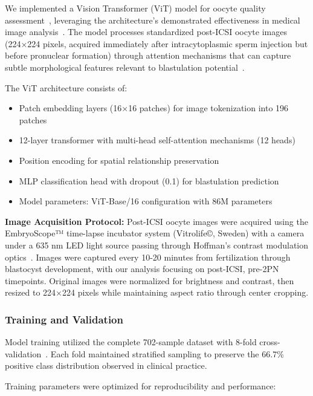 We implemented a Vision Transformer (ViT) model for oocyte quality assessment~\cite{dosovitskiy2021image}, leveraging the architecture's demonstrated effectiveness in medical image analysis~\cite{alhammuri2023vision}. The model processes standardized post-ICSI oocyte images (224×224 pixels, acquired immediately after intracytoplasmic sperm injection but before pronuclear formation) through attention mechanisms that can capture subtle morphological features relevant to blastulation potential~\cite{zhang2021machine}.

The ViT architecture consists of:
\begin{itemize}
\item Patch embedding layers (16×16 patches) for image tokenization into 196 patches
\item 12-layer transformer with multi-head self-attention mechanisms (12 heads)
\item Position encoding for spatial relationship preservation
\item MLP classification head with dropout (0.1) for blastulation prediction
\item Model parameters: ViT-Base/16 configuration with 86M parameters
\end{itemize}

\textbf{Image Acquisition Protocol:} Post-ICSI oocyte images were acquired using the EmbryoScope™ time-lapse incubator system (Vitrolife©, Sweden) with a camera under a 635 nm LED light source passing through Hoffman's contrast modulation optics~\cite{gomez2022timelapse}. Images were captured every 10-20 minutes from fertilization through blastocyst development, with our analysis focusing on post-ICSI, pre-2PN timepoints. Original images were normalized for brightness and contrast, then resized to 224×224 pixels while maintaining aspect ratio through center cropping.

\subsubsection{Training and Validation}

Model training utilized the complete 702-sample dataset with 8-fold cross-validation~\cite{varoquaux2022machine}. Each fold maintained stratified sampling to preserve the 66.7\% positive class distribution observed in clinical practice.

Training parameters were optimized for reproducibility and performance:

